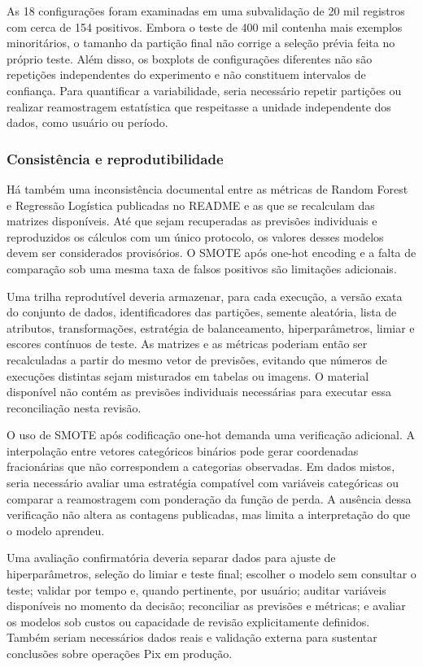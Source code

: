 \documentclass[11pt,a4paper]{article}
\begin{document}
As 18 configurações foram examinadas em uma subvalidação de 20 mil registros com cerca de 154 positivos. Embora o teste de 400 mil contenha mais exemplos minoritários, o tamanho da partição final não corrige a seleção prévia feita no próprio teste. Além disso, os boxplots de configurações diferentes não são repetições independentes do experimento e não constituem intervalos de confiança. Para quantificar a variabilidade, seria necessário repetir partições ou realizar reamostragem estatística que respeitasse a unidade independente dos dados, como usuário ou período.

\subsubsection{Consistência e reprodutibilidade}

Há também uma inconsistência documental entre as métricas de Random Forest e Regressão Logística publicadas no README e as que se recalculam das matrizes disponíveis. Até que sejam recuperadas as previsões individuais e reproduzidos os cálculos com um único protocolo, os valores desses modelos devem ser considerados provisórios. O SMOTE após one-hot encoding e a falta de comparação sob uma mesma taxa de falsos positivos são limitações adicionais.

Uma trilha reprodutível deveria armazenar, para cada execução, a versão exata do conjunto de dados, identificadores das partições, semente aleatória, lista de atributos, transformações, estratégia de balanceamento, hiperparâmetros, limiar e escores contínuos de teste. As matrizes e as métricas poderiam então ser recalculadas a partir do mesmo vetor de previsões, evitando que números de execuções distintas sejam misturados em tabelas ou imagens. O material disponível não contém as previsões individuais necessárias para executar essa reconciliação nesta revisão.

O uso de SMOTE após codificação one-hot demanda uma verificação adicional. A interpolação entre vetores categóricos binários pode gerar coordenadas fracionárias que não correspondem a categorias observadas. Em dados mistos, seria necessário avaliar uma estratégia compatível com variáveis categóricas ou comparar a reamostragem com ponderação da função de perda. A ausência dessa verificação não altera as contagens publicadas, mas limita a interpretação do que o modelo aprendeu.

Uma avaliação confirmatória deveria separar dados para ajuste de hiperparâmetros, seleção do limiar e teste final; escolher o modelo sem consultar o teste; validar por tempo e, quando pertinente, por usuário; auditar variáveis disponíveis no momento da decisão; reconciliar as previsões e métricas; e avaliar os modelos sob custos ou capacidade de revisão explicitamente definidos. Também seriam necessários dados reais e validação externa para sustentar conclusões sobre operações Pix em produção.
\end{document}
